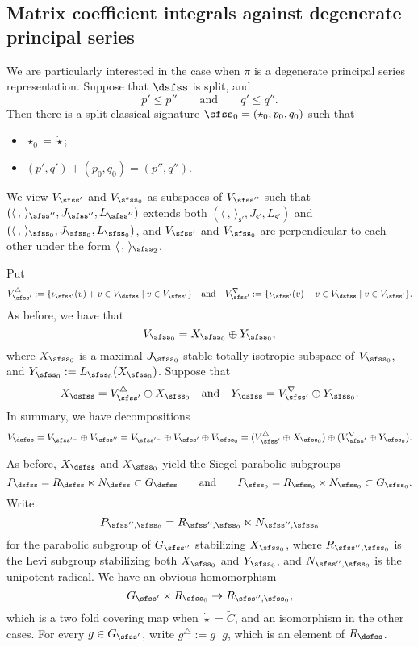 \documentclass[12pt,a4paper]{amsart}
\newcommand{\la}{\langle}
\newcommand{\ra}{\rangle}
\numberwithin{equation}{section}
\theoremstyle{remark}
\begin{document}
\subsection{Matrix coefficient integrals against degenerate principal series}
\label{sec:DP}

We are particularly interested in the case when $\dot \pi$ is a degenerate principal series representation.
Suppose that $\dsfss$ is split,  and 
\[
  p'\leq p''\qquad\textrm{and}\qquad q'\leq q''. 
\]
Then there is a  split classical signature $\sfss_0=(\star_0, p_0, q_0)$ such that 
\begin{itemize}
\item $\star_0=\dot \star$;
  \item $(p', q')+(p_0, q_0)=(p'', q'')$.
\end{itemize}
We view $V_{\sfss'}$  and $V_{\sfss_0}$ as subspaces of $V_{\sfss''}$ such that $(\la\,,\,\ra_{\sfss''}, J_{\sfss''},L_{\sfss''})$  extends  both $(\la\,,\,\ra_{\mathsf s'}, J_{\mathsf s'}, L_{\mathsf s'})$ and $(\la\,,\,\ra_{\sfss_0}, J_{\sfss_0},L_{\sfss_0})$, and  $V_{\sfss'}$  and $V_{\sfss_0}$ are perpendicular to each other under the form $\la\, ,\,\ra_{\sfss_2}$. 


Put
\[
   V_{\sfss'}^\triangle:=\{\iota_{\sfss'}(v)+v\in V_\dsfss \mid v\in V_{\sfss'}\}\quad\textrm{and}\quad V_{\sfss'}^\nabla:=\{\iota_{\sfss'}(v)-v\in V_\dsfss \mid v\in V_{\sfss'}\}.
 \]
As before, we have that
\[
  V_{\sfss_0}=X_{\sfss_0}\oplus Y_{\sfss_0},
\]
where $X_{\sfss_0}$ is a maximal $J_{\sfss_0}$-stable totally isotropic subspace of $V_{\sfss_0}$, and $Y_{\sfss_0}:=L_{\sfss_0}(X_{\sfss_0})$.
Suppose that
 \[
 X_{\dsfss}= V_{\sfss'}^\triangle \oplus X_{\sfss_0}\quad\textrm{and}\quad Y_{\dsfss}=V_{\sfss'}^\nabla \oplus Y_{\sfss_0}.
 \]
In summary, we have decompositions
\[
  V_{\dsfss}=V_{\sfss'^-}\oplus V_{\sfss''}= V_{\sfss'^-}\oplus V_{\sfss'}\oplus  V_{\sfss_0}= (V_{\sfss'}^\triangle \oplus X_{\sfss_0})\oplus (V_{\sfss'}^\nabla \oplus Y_{\sfss_0}).
\]

As before, $X_\dsfss$ and $X_{\sfss_0}$ yield 
 the Siegel parabolic subgroups 
 \[
  P_{\dsfss}=R_{\dsfss}\ltimes N_\dsfss\subset G_\dsfss\qquad \textrm{and}\qquad P_{\sfss_0}=R_{\sfss_0}\ltimes N_{\sfss_0}\subset G_{\sfss_0}.
 \]
 Write
\[
  P_{\sfss'',\sfss_0}=R_{\sfss'',\sfss_0}\ltimes N_{\sfss'',\sfss_0}
\]
for the parabolic subgroup of $G_{\sfss''}$ stabilizing $X_{\sfss_0}$, where $R_{\sfss'',\sfss_0}$ is the Levi subgroup stabilizing both $X_{\sfss_0}$ and $Y_{\sfss_0}$, and $N_{\sfss'',\sfss_0}$ is the unipotent radical. We have an obvious homomorphism
\[
  G_{\sfss'}\times R_{\sfss_0}\rightarrow R_{\sfss'',\sfss_0}, 
\]
which is a two fold covering map when $\dot \star=\widetilde C$, and an isomorphism in the other cases. 
For every $g\in G_{\sfss'}$, write $g^\triangle:= g^- g$, which is an element of $R_{\dsfss}$.
\end{document}
